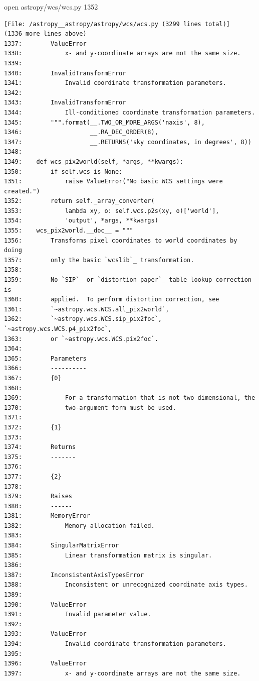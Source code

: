 {\begin{agentbox}
\hrulefill
\begin{CodeVerbatim}[breaklines=true, breakanywhere=true]
open astropy/wcs/wcs.py 1352
\end{CodeVerbatim}
\end{agentbox}
\begin{observationbox}\begin{Verbatim}[breaklines=true, breakanywhere=true]
[File: /astropy__astropy/astropy/wcs/wcs.py (3299 lines total)]
(1336 more lines above)
1337:        ValueError
1338:            x- and y-coordinate arrays are not the same size.
1339:
1340:        InvalidTransformError
1341:            Invalid coordinate transformation parameters.
1342:
1343:        InvalidTransformError
1344:            Ill-conditioned coordinate transformation parameters.
1345:        """.format(__.TWO_OR_MORE_ARGS('naxis', 8),
1346:                   __.RA_DEC_ORDER(8),
1347:                   __.RETURNS('sky coordinates, in degrees', 8))
1348:
1349:    def wcs_pix2world(self, *args, **kwargs):
1350:        if self.wcs is None:
1351:            raise ValueError("No basic WCS settings were created.")
1352:        return self._array_converter(
1353:            lambda xy, o: self.wcs.p2s(xy, o)['world'],
1354:            'output', *args, **kwargs)
1355:    wcs_pix2world.__doc__ = """
1356:        Transforms pixel coordinates to world coordinates by doing
1357:        only the basic `wcslib`_ transformation.
1358:
1359:        No `SIP`_ or `distortion paper`_ table lookup correction is
1360:        applied.  To perform distortion correction, see
1361:        `~astropy.wcs.WCS.all_pix2world`,
1362:        `~astropy.wcs.WCS.sip_pix2foc`, `~astropy.wcs.WCS.p4_pix2foc`,
1363:        or `~astropy.wcs.WCS.pix2foc`.
1364:
1365:        Parameters
1366:        ----------
1367:        {0}
1368:
1369:            For a transformation that is not two-dimensional, the
1370:            two-argument form must be used.
1371:
1372:        {1}
1373:
1374:        Returns
1375:        -------
1376:
1377:        {2}
1378:
1379:        Raises
1380:        ------
1381:        MemoryError
1382:            Memory allocation failed.
1383:
1384:        SingularMatrixError
1385:            Linear transformation matrix is singular.
1386:
1387:        InconsistentAxisTypesError
1388:            Inconsistent or unrecognized coordinate axis types.
1389:
1390:        ValueError
1391:            Invalid parameter value.
1392:
1393:        ValueError
1394:            Invalid coordinate transformation parameters.
1395:
1396:        ValueError
1397:            x- and y-coordinate arrays are not the same size.

\end{Verbatim}
\end{observationbox}}
